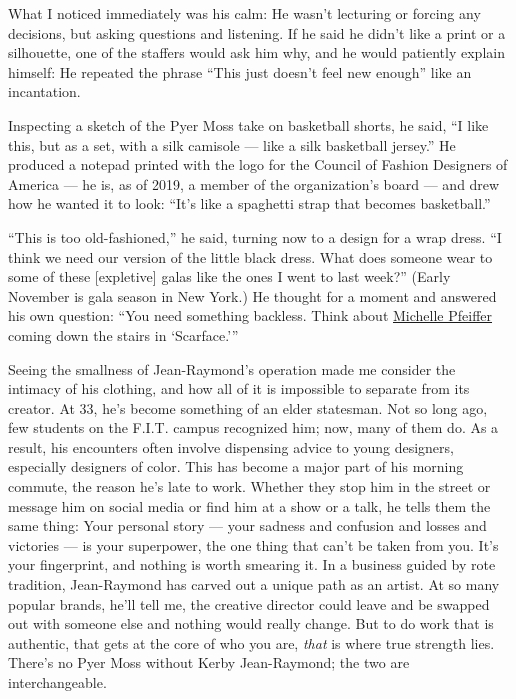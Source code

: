 What I noticed immediately was his calm: He wasn't lecturing or forcing
any decisions, but asking questions and listening. If he said he didn't
like a print or a silhouette, one of the staffers would ask him why, and
he would patiently explain himself: He repeated the phrase ``This just
doesn't feel new enough'' like an incantation.

Inspecting a sketch of the Pyer Moss take on basketball shorts, he said,
``I like this, but as a set, with a silk camisole --- like a silk
basketball jersey.'' He produced a notepad printed with the logo for the
Council of Fashion Designers of America --- he is, as of 2019, a member
of the organization's board --- and drew how he wanted it to look:
``It's like a spaghetti strap that becomes basketball.''

``This is too old-fashioned,'' he said, turning now to a design for a
wrap dress. ``I think we need our version of the little black dress.
What does someone wear to some of these {[}expletive{]} galas like the
ones I went to last week?'' (Early November is gala season in New York.)
He thought for a moment and answered his own question: ``You need
something backless. Think about
\href{https://www.nytimes3xbfgragh.onion/2019/12/06/t-magazine/michelle-pfeiffer-perfume-bottles.html}{Michelle
Pfeiffer} coming down the stairs in `Scarface.'''

Seeing the smallness of Jean-Raymond's operation made me consider the
intimacy of his clothing, and how all of it is impossible to separate
from its creator. At 33, he's become something of an elder statesman.
Not so long ago, few students on the F.I.T. campus recognized him; now,
many of them do. As a result, his encounters often involve dispensing
advice to young designers, especially designers of color. This has
become a major part of his morning commute, the reason he's late to
work. Whether they stop him in the street or message him on social media
or find him at a show or a talk, he tells them the same thing: Your
personal story --- your sadness and confusion and losses and victories
--- is your superpower, the one thing that can't be taken from you. It's
your fingerprint, and nothing is worth smearing it. In a business guided
by rote tradition, Jean-Raymond has carved out a unique path as an
artist. At so many popular brands, he'll tell me, the creative director
could leave and be swapped out with someone else and nothing would
really change. But to do work that is authentic, that gets at the core
of who you are, \emph{that} is where true strength lies. There's no Pyer
Moss without Kerby Jean-Raymond; the two are interchangeable.

